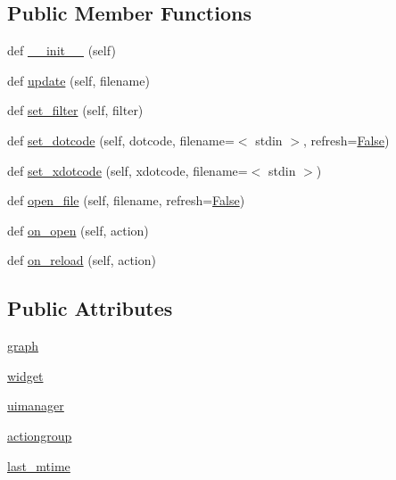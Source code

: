 \subsection*{Public Member Functions}
\begin{DoxyCompactItemize}
\item 
def \hyperlink{classsmacc__viewer_1_1xdot_1_1xdot_1_1DotWindow_a6e77276f49d67d5e40a48acb4e324a8a}{\+\_\+\+\_\+init\+\_\+\+\_\+} (self)
\item 
def \hyperlink{classsmacc__viewer_1_1xdot_1_1xdot_1_1DotWindow_a034cf44b3ace32555543aecdc5bea0e6}{update} (self, filename)
\item 
def \hyperlink{classsmacc__viewer_1_1xdot_1_1xdot_1_1DotWindow_a27dfb6b58a5edd9cacae2dde977b58b8}{set\+\_\+filter} (self, filter)
\item 
def \hyperlink{classsmacc__viewer_1_1xdot_1_1xdot_1_1DotWindow_a0628cbc37723198ff1bab7cbd3c70ad3}{set\+\_\+dotcode} (self, dotcode, filename=\textquotesingle{}$<$ stdin $>$\textquotesingle{}, refresh=\hyperlink{namespacesmacc__viewer_a5928e8da279785cbab9011356c3eaa87}{False})
\item 
def \hyperlink{classsmacc__viewer_1_1xdot_1_1xdot_1_1DotWindow_ad37b64f997047ac0d909f283b1ac3f38}{set\+\_\+xdotcode} (self, xdotcode, filename=\textquotesingle{}$<$ stdin $>$\textquotesingle{})
\item 
def \hyperlink{classsmacc__viewer_1_1xdot_1_1xdot_1_1DotWindow_a1fd99c9d7a38dff168054383a435f00a}{open\+\_\+file} (self, filename, refresh=\hyperlink{namespacesmacc__viewer_a5928e8da279785cbab9011356c3eaa87}{False})
\item 
def \hyperlink{classsmacc__viewer_1_1xdot_1_1xdot_1_1DotWindow_aa46fccb243521df058e249dfa42f544c}{on\+\_\+open} (self, action)
\item 
def \hyperlink{classsmacc__viewer_1_1xdot_1_1xdot_1_1DotWindow_a2a05d4752e76055f81624e561450d0bb}{on\+\_\+reload} (self, action)
\end{DoxyCompactItemize}
\subsection*{Public Attributes}
\begin{DoxyCompactItemize}
\item 
\hyperlink{classsmacc__viewer_1_1xdot_1_1xdot_1_1DotWindow_abc3c11e74308a0c1b3011b5c008e0df6}{graph}
\item 
\hyperlink{classsmacc__viewer_1_1xdot_1_1xdot_1_1DotWindow_acf94d47f2f1d324385997e26e6a46225}{widget}
\item 
\hyperlink{classsmacc__viewer_1_1xdot_1_1xdot_1_1DotWindow_a3a65f7d7acab6b8f2c9f720bfc3389dc}{uimanager}
\item 
\hyperlink{classsmacc__viewer_1_1xdot_1_1xdot_1_1DotWindow_a3e2e5fc8cc3f87f2515e6bca81e9d018}{actiongroup}
\item 
\hyperlink{classsmacc__viewer_1_1xdot_1_1xdot_1_1DotWindow_a9c07c47acc6f1125c1c5fe95ed2ffbce}{last\+\_\+mtime}
\end{DoxyCompactItemize}
